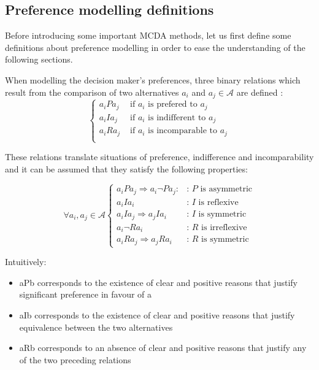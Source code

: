 \subsection{Preference modelling definitions}
Before introducing some important MCDA methods, let us first define some definitions about preference modelling in order to ease the understanding of the following sections.

When modelling the decision maker's preferences, three binary relations which result from the comparison of two alternatives $a_i$ and $a_j \in \mathcal{A}$ are defined \cite{Vin92}:
\begin{equation}
\left\{
\begin{array}{ll}
a_iPa_j & \text{ if $a_i$ is prefered to $a_j$}\\
a_iIa_j & \text{ if $a_i$ is indifferent to $a_j$}\\
a_iRa_j & \text{ if $a_i$ is incomparable to $a_j$}\\
\end{array}
\right.
\end{equation}

These relations translate situations of preference, indifference and incomparability and it can be assumed that they satisfy the following properties:

\begin{equation}
\forall a_i, a_j \in \mathcal{A} \left\{
	\begin{array}{ll}
	a_iPa_j \Rightarrow a_i \neg P a_j : & \text{: $P$ is asymmetric}\\
	a_iIa_i & \text{: $I$ is reflexive}\\
	a_iIa_j \Rightarrow a_jIa_i & \text{: $I$ is symmetric}\\
	a_i \neg R a_i & \text{: $R$ is irreflexive}\\
	a_iRa_j \Rightarrow a_jRa_i & \text{: $R$ is symmetric}
	\end{array}
\right.
\end{equation}

Intuitively:
\begin{itemize}
\item aPb corresponds to the existence of clear and positive reasons that justify significant preference in favour of a
\item aIb corresponds to the existence of clear and positive reasons that justify equivalence between the two alternatives
\item aRb corresponds to an absence of clear and positive reasons that justify any of the two preceding relations
\end{itemize}

